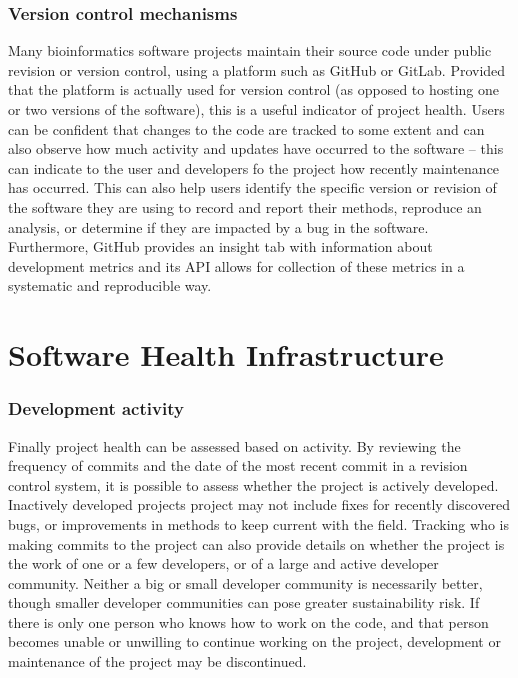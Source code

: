 \subsubsection{Version control mechanisms}
Many bioinformatics software projects maintain their source code under public revision or version control, using a platform such as GitHub or GitLab. Provided that the platform is actually used for version control (as opposed to hosting one or two versions of the software), this is a useful indicator of project health. Users can be confident that changes to the code are tracked to some extent and can also observe how much activity and updates have occurred to the software -- this can indicate to the user and developers fo the project how recently maintenance has occurred. This can also help users identify the specific version or revision of the software they are using to record and report their methods, reproduce an analysis, or determine if they are impacted by a bug in the software. Furthermore, GitHub provides an insight tab with information about development metrics and its API allows for collection of these metrics in a systematic and reproducible way. 

\section{Software Health Infrastructure}

\subsubsection{Development activity}
Finally project health can be assessed based on activity. By reviewing the frequency of commits and the date of the most recent commit in a revision control system, it is possible to assess whether the project is actively developed. Inactively developed projects project may not include fixes for recently discovered bugs, or improvements in methods to keep current with the field. Tracking who is making commits to the project can also provide details on whether the project is the work of one or a few developers, or of a large and active developer community. Neither a big or small developer community is necessarily better, though smaller developer communities can pose greater sustainability risk. If there is only one person who knows how to work on the code, and that person becomes unable or unwilling to continue working on the project, development or maintenance of the project may be discontinued. 



